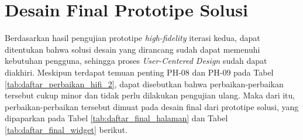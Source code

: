 \section{Desain Final Prototipe Solusi}
\label{sec:final}

Berdasarkan hasil pengujian prototipe \textit{high-fidelity} iterasi kedua, dapat ditentukan bahwa solusi desain yang dirancang sudah dapat memenuhi kebutuhan pengguna, sehingga proses \textit{User-Centered Design} sudah dapat diakhiri. Meskipun terdapat temuan penting PH-08 dan PH-09 pada Tabel \ref{tab:daftar_perbaikan_hifi_2}, dapat disebutkan bahwa perbaikan-perbaikan tersebut cukup minor dan tidak perlu dilakukan pengujian ulang. Maka dari itu, perbaikan-perbaikan tersebut dimuat pada desain final dari prototipe solusi, yang dipaparkan pada Tabel \ref{tab:daftar_final_halaman} dan Tabel \ref{tab:daftar_final_widget} berikut.

\newlength{\finalwidth}
\setlength{\finalwidth}{0.325\textwidth}

\newlength{\finaldescwidth}
\setlength{\finaldescwidth}{0.42\textwidth}

\newcommand{\finaldesc}[1]{\desc{\finaldescwidth}{#1}}

\newcommand{\final}[1]{\begin{center}\texttt{[image: \#1]}\end{center}}
\newcommand{\finalwidget}[2]{\begin{center}\texttt{[image: \#2]}\end{center}}

